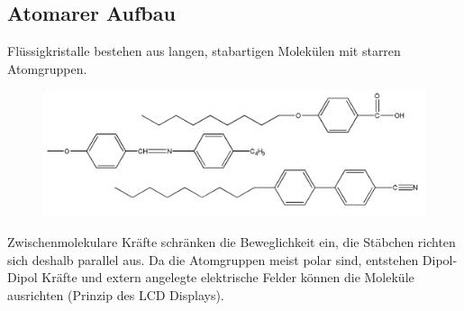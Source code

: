 \subsection{Atomarer Aufbau}
Flüssigkristalle bestehen aus langen, stabartigen Molekülen mit starren Atomgruppen. 

\begin{figure}[htbp]
	\centering
	\includegraphics[width=0.8\linewidth]{images/11_Atome.png}
\end{figure}

Zwischenmolekulare Kräfte schränken die Beweglichkeit ein, die Stäbchen richten sich deshalb parallel aus. Da die Atomgruppen meist polar sind, entstehen Dipol-Dipol Kräfte und extern angelegte elektrische Felder können die Moleküle ausrichten (Prinzip des LCD Displays). 